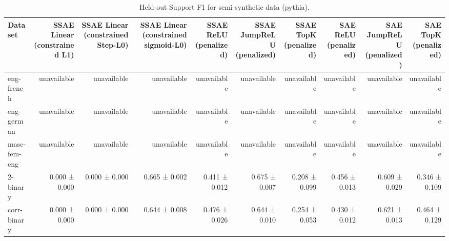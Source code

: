 \begin{table}[t]
\centering
\caption{Held-out Support F1 for semi-synthetic data (pythia).}
\label{tab:semisynthetic-pythia-support-f1}
\begin{tabular}{lrrrrrrrrr}
\toprule
Dataset & SSAE Linear (constrained L1) & SSAE Linear (constrained Step-L0) & SSAE Linear (constrained sigmoid-L0) & SSAE ReLU (penalized) & SSAE JumpReLU (penalized) & SSAE TopK (penalized) & SAE ReLU (penalized) & SAE JumpReLU (penalized) & SAE TopK (penalized) \\
\midrule
eng-french & unavailable & unavailable & unavailable & unavailable & unavailable & unavailable & unavailable & unavailable & unavailable \\
eng-german & unavailable & unavailable & unavailable & unavailable & unavailable & unavailable & unavailable & unavailable & unavailable \\
masc-fem-eng & unavailable & unavailable & unavailable & unavailable & unavailable & unavailable & unavailable & unavailable & unavailable \\
2-binary & 0.000 ± 0.000 & 0.000 ± 0.000 & 0.665 ± 0.002 & 0.411 ± 0.012 & 0.675 ± 0.007 & 0.208 ± 0.099 & 0.456 ± 0.013 & 0.609 ± 0.029 & 0.346 ± 0.109 \\
corr-binary & 0.000 ± 0.000 & 0.000 ± 0.000 & 0.644 ± 0.008 & 0.476 ± 0.026 & 0.644 ± 0.010 & 0.254 ± 0.053 & 0.430 ± 0.012 & 0.621 ± 0.013 & 0.464 ± 0.129 \\
\bottomrule
\end{tabular}
\end{table}
